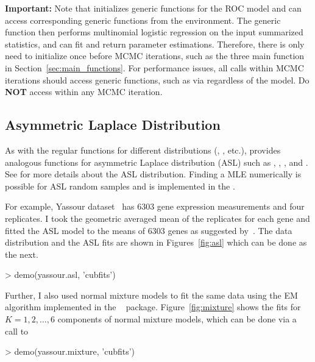 {\color{red} \bf Important:}
Note that  initializes generic functions
for the ROC model and  can access corresponding generic
functions from the  environment. The generic function then
performs multinomial logistic regression on the input summarized statistics,
and  can fit and return parameter estimations.
Therefore, there is only need to initialize once before MCMC iterations, such as
the three main function in Section~\ref{sec:main_functions}. For performance
issues, all calls within MCMC iterations should access generic functions, such
as via  regardless of the model. Do \textbf{NOT}
access  within any MCMC iteration.




\subsection[Asymmetric Laplace Distribution]{Asymmetric Laplace Distribution}
\label{sec:asl}

As with the regular  functions for different distributions 
(, , etc.),
 provides analogous functions for asymmetric Laplace distribution
(ASL) such as , , , and .
See \citep{KKP2001} for more details about the ASL distribution.
Finding a MLE numerically is possible for ASL random samples and
is implemented in the .

For example,
Yassour dataset~\citep{Yassour2009} has 6303 gene expression measurements and
four replicates.
I took the geometric averaged mean of the replicates for each gene and
fitted the ASL model to the means of 6303 genes as suggested
by~\cite{Wallace2013}.
The data distribution and the ASL fits are shown
in Figures~\ref{fig:asl} which can be done as the next.
\begin{Code}
> demo(yassour.asl, 'cubfits')
\end{Code}

Further, I also used normal mixture models to fit the same data using the EM
algorithm implemented in the ~\citep{EMCluster} package.
Figure~\ref{fig:mixture} shows the fits
for $K = 1, 2,\ldots, 6$ components of normal mixture models,
which can be done via a call to
\begin{Code}
> demo(yassour.mixture, 'cubfits')
\end{Code}

